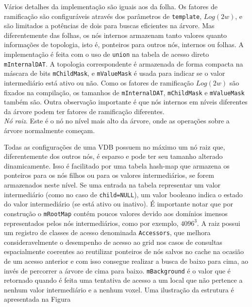 Vários detalhes da implementação são iguais aos da folha. Os fatores de ramificação são configuráveis através dos parâmetros de \texttt{template}, $Log(2w)$, e são limitados a potências de dois para buscas eficientes na árvore. Mas diferentemente das folhas, os nós internos armazenam tanto valores quanto informações de topologia, isto é, ponteiros para outros nós, internos ou folhas. A implementação é feita com o uso de \texttt{union} na tabela de acesso direto \texttt{mInternalDAT}. A topologia correspondente é armazenada de forma compacta na máscara de bits \texttt{mChildMask}, e \texttt{mValueMask} é usada para indicar se o valor intermediário está ativo ou não. Como os fatores de ramificação $Log(2w)$ são fixados na compilação, os tamanhos de \texttt{mInternalDAT}, \texttt{mChildMask} e \texttt{mValueMask} também são. Outra observação importante é que nós internos em níveis diferentes da árvore podem ter fatores de ramificação diferentes. \\

\emph{Nó raiz}. Este é o nó no nível mais alto da árvore, onde as operações sobre a árvore normalmente começam. 



Todas as configurações de uma VDB possuem no máximo um nó raiz que, diferentemente dos outros nós, é esparso e pode ter seu tamanho alterado dinamicamente. Isso é facilitado por uma tabela hash-map que armazena os ponteiros para os nós filhos ou para os valores intermediários, se forem armazenados neste nível. Se uma entrada na tabela representar um valor intermediário (como no caso de \texttt{child=NULL}), um valor booleano indica o estado do valor intermediário (se está ativo ou inativo). É importante notar que por construção o \texttt{mRootMap} contém poucos valores devido aos domínios imensos representados pelos nós intermediários, como por exemplo, $4096^{3}$.
A raiz possui um registro de classes de acesso denominada \texttt{Accessors}, que melhora consideravelmente o desempenho de acesso ao grid nos casos de consultas espacialmente coerentes ao reutilizar ponteiros de nós salvos no cache na ocasião de um acesso anterior e com isso consegue realizar a busca de baixo para cima, ao invés de percorrer a árvore de cima para baixo. \texttt{mBackground} é o valor que é retornado quando é feita uma tentativa de acesso a um local que não pertence a nenhum valor intermediário e a nenhum voxel. Uma ilustração da estrutura é apresentada na Figura

